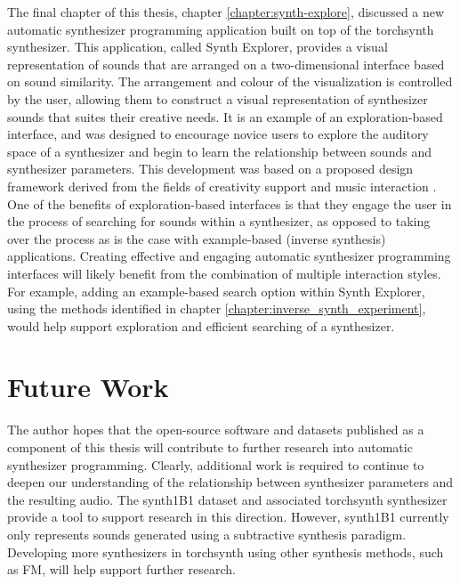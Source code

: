 
The final chapter of this thesis, chapter \ref{chapter:synth-explore}, discussed a new automatic synthesizer programming application built on top of the torchsynth synthesizer. This application, called Synth Explorer, provides a visual representation of sounds that are arranged on a two-dimensional interface based on sound similarity. The arrangement and colour of the visualization is controlled by the user, allowing them to construct a visual representation of synthesizer sounds that suites their creative needs. It is an example of an exploration-based interface, and was designed to encourage novice users to explore the auditory space of a synthesizer and begin to learn the relationship between sounds and synthesizer parameters. This development was based on a proposed design framework derived from the fields of creativity support \cite{shneiderman2007creativity} and music interaction \cite{holland2013music}. One of the benefits of exploration-based interfaces is that they engage the user in the process of searching for sounds within a synthesizer, as opposed to taking over the process as is the case with example-based (inverse synthesis) applications. Creating effective and engaging automatic synthesizer programming interfaces will likely benefit from the combination of multiple interaction styles. For example, adding an example-based search option within Synth Explorer, using the methods identified in chapter \ref{chapter:inverse_synth_experiment}, would help support exploration and efficient searching of a synthesizer.

\section{Future Work}
The author hopes that the open-source software and datasets published as a component of this thesis will contribute to further research into automatic synthesizer programming. Clearly, additional work is required to continue to deepen our understanding of the relationship between synthesizer parameters and the resulting audio. The synth1B1 dataset and associated torchsynth synthesizer provide a tool to support research in this direction. However, synth1B1 currently only represents sounds generated using a subtractive synthesis paradigm. Developing more synthesizers in torchsynth using other synthesis methods, such as FM, will help support further research.

